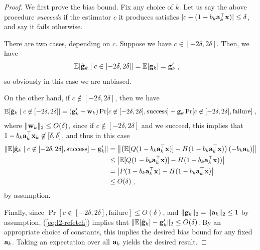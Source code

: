\documentclass{article}
\renewcommand{\vec}[1]{\mathbf{#1}}
\def\a{{\bf a}}
\def\g{{\bf g}}
\def\x{{\bf x}}
\def\w{{\bf w}}
\def\E{\mathbb{E}}
\begin{document}
\begin{proof}
We first prove the bias bound.
Fix any choice of $k$.
Let us say the above procedure \emph{succeeds} if the estimator $c$ it produces satisfies $|c - (1 - b_k \a_k^\top \x) | \leq \delta$, and say it fails otherwise.

\noindent There are two cases, depending on $c$.
Suppose we have $c \in [-2 \delta, 2 \delta]$.
Then, we have
\begin{align*}
\E [\hat{\g}_k \mid c \in [-2 \delta, 2 \delta]] &= \E [{\g}_k] = \g'_k \; ,
\end{align*}
so obviously in this case we are unbiased.

\noindent On the other hand, if $c \not\in [-2 \delta, 2 \delta]$, then we have
\begin{equation}
\label{eq:l2-refetch}
\E [\hat{\g}_k \mid c \not\in [-2 \delta, 2 \delta]] = (\g'_k + \w_k) \Pr [c \not\in [-2 \delta, 2 \delta], \mathrm{success}] + \g_k  \Pr [c \not\in [-2 \delta, 2 \delta], \mathrm{failure}] \; ,
\end{equation}
where $\| \w_k \|_2 \leq O(\delta)$, since if $c \not\in [-2 \delta, 2 \delta]$ and we succeed, this implies that $1 - b_k \a_k^\top \x_k \not\in [\delta, \delta]$, and thus in this case 
\begin{align*}
\left\| \E [\hat{\g}_k \mid c \not\in [-2 \delta, 2 \delta], \mathrm{success}] - \g'_k \right\| &= \left\| \left( \E [Q(1 - b_k \a_k^\top \x)] - H(1 - b_k \a_k^\top \x) \right)  (- b_k \a_k) \right\| \\
&\leq \left| \E [Q(1 - b_k \a_k^\top \x)] - H(1 - b_k \a_k^\top \x)) \right| \\
&= \left| P(1 - b_k \a_k^\top \x) - H(1 - b_k \a_k^\top \x ) \right| \\
&\leq O(\delta) \; ,
\end{align*}
by assumption.

Finally, since $\Pr [c \not\in [-2 \delta, 2 \delta], \mathrm{failure}] \leq O(\delta)$, and $\| \vec{g}_k \|_2 = \| \a_k \|_2 \leq 1$ by assumption, (\ref{eq:l2-refetch}) implies that $\| \E [\hat{\g}_k] - \g'_k \|_2 \leq O(\delta)$.
By an appropriate choice of constants, this implies the desired bias bound for any fixed $\a_k$.
Taking an expectation over all $\a_k$ yields the desired result.


\end{proof}
\end{document}
